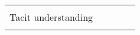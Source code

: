 \begin{landscape}
\begin{table}[]
\begin{tabular}{@{}lllll@{}}
                                                                          &                    &                                                                                                               &                                                                                                                                                                                                                                                                                                                                                                                                                                            &                                                                                                                                                                                                                                                                            \\
Tacit understanding                                                       &                    &                                                                                                               &                                                                                                                                                                                                                                                                                                                                                                                                                                            &                                                                                                                                                                                                                                                                            \\
                                                                          &                    &                                                                                                               &                                                                                                                                                                                                                                                                                                                                                                                                                                            &                                                                                                                                                                                                                                                                            \\

\end{tabular}
\end{table}
\end{landscape}
